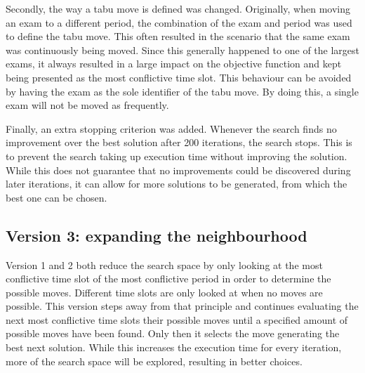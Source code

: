 Secondly, the way a tabu move is defined was changed. Originally, when moving an exam to a different period, the combination of the exam and period was used to define the tabu move. This often resulted in the scenario that the same exam was continuously being moved. Since this generally happened to one of the largest exams, it always resulted in a large impact on the objective function and kept being presented as the most conflictive time slot. This behaviour can be avoided by having the exam as the sole identifier of the tabu move. By doing this, a single exam will not be moved as frequently.

Finally, an extra stopping criterion was added. Whenever the search finds no improvement over the best solution after 200 iterations, the search stops. This is to prevent the search taking up execution time without improving the solution. While this does not guarantee that no improvements could be discovered during later iterations, it can allow for more solutions to be generated, from which the best one can be chosen.
\subsection{Version 3: expanding the neighbourhood}

Version 1 and 2 both reduce the search space by only looking at the most conflictive time slot of the most conflictive period in order to determine the possible moves. Different time slots are only looked at when no moves are possible. This version steps away from that principle and continues evaluating the next most conflictive time slots their possible moves until a specified amount of possible moves have been found. Only then it selects the move generating the best next solution. While this increases the execution time for every iteration, more of the search space will be explored, resulting in better choices.




